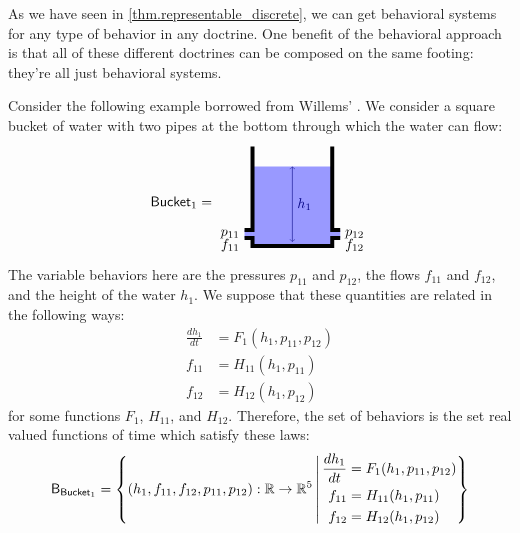 \documentclass[DynamicalBook]{subfiles}
\begin{document}
As we have seen in
\cref{thm.representable_discrete}, we can get behavioral systems for any type of
behavior in any doctrine. One benefit of the behavioral approach is that all of
these different doctrines can be composed on the same footing: they're all just
behavioral systems.

Consider the following example borrowed from Willems'
\cite{Willems:Behavioral.Approach}. We consider a square bucket of water with
two pipes at the bottom through which the water can flow:
\[
  \Sys{Bucket}_1 =
  \begin{tikzpicture}[baseline=(center)]
    \fill[blue!40!white] (0, 0) rectangle (2,2);
    \fill[blue!40!white] (-.2, .2) rectangle (0.01,.4);
    \fill[blue!40!white] (2.2, .2) rectangle (1.99,.4);
    \draw[line width = .1cm] (0, 2.5) -- (0,.4) -- (-.2,.4);
    \draw[line width = .1cm] (-.2, .2) -- (0,.2) -- (0,0)
      -- (2,0) -- (2, .2) -- (2.2, .2);
    \draw[line width = .1cm] (2.2, .4) -- (2, .4) -- (2, 2.5);

    \draw[<->, blue!50!black] (1,.1cm) -- node[right] {$h_1$} (1, 2);
    \node[left] at (-.2, .3) {$p_{11}$};
    \node[below left] at (-.2, .3) {$f_{11}$};
    \node[right] at (2.2, .3) {$p_{12}$};
    \node[below right] at (2.2, .3) {$f_{12}$};

    \node (center) at (1, 1) {};
  \end{tikzpicture}
\]
The variable behaviors here are the pressures $p_{11}$ and $p_{12}$, the flows
$f_{11}$ and $f_{12}$, and the height of the water $h_1$. We suppose that these
quantities are related in the following ways:
\begin{align*}
  \frac{dh_1}{dt} &= F_1(h_1, p_{11}, p_{12}) \\
  f_{11} &= H_{11}(h_1, p_{11})\\
  f_{12} &= H_{12}(h_1, p_{12})
\end{align*}
for some functions $F_{1}$, $H_{11}$, and $H_{12}$. Therefore, the set of
behaviors is the set real valued functions of time which satisfy these laws:
\begin{equation}\label{eqn:bucket1.def}
\mathsf{B}_{\mathsf{Bucket}_1} = \left\{ (h_1, f_{11}, f_{12}, p_{11}, p_{12}) : \mathbb{R}
  \to \mathbb{R}^5\, \middle|\,
\begin{aligned}
  \frac{dh_1}{dt} &= F_1(h_1, p_{11}, p_{12}) \\
  f_{11} &= H_{11}(h_1, p_{11})\\
  f_{12} &= H_{12}(h_1, p_{12})
\end{aligned}
\right\}
\end{equation}
\end{document}
